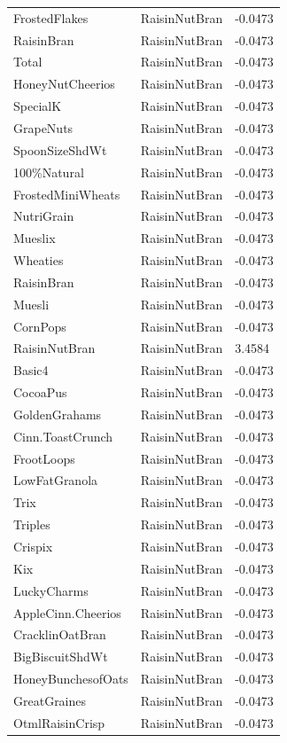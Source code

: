 \begin{table}[!htbp]
\begin{tabular}{lll}
FrostedFlakes & RaisinNutBran & -0.0473
\\
RaisinBran & RaisinNutBran & -0.0473
\\
Total & RaisinNutBran & -0.0473
\\
HoneyNutCheerios & RaisinNutBran & -0.0473
\\
SpecialK & RaisinNutBran & -0.0473
\\
GrapeNuts & RaisinNutBran & -0.0473
\\
SpoonSizeShdWt & RaisinNutBran & -0.0473
\\
100\%Natural & RaisinNutBran & -0.0473
\\
FrostedMiniWheats & RaisinNutBran & -0.0473
\\
NutriGrain & RaisinNutBran & -0.0473
\\
Mueslix & RaisinNutBran & -0.0473
\\
Wheaties & RaisinNutBran & -0.0473
\\
RaisinBran & RaisinNutBran & -0.0473
\\
Muesli & RaisinNutBran & -0.0473
\\
CornPops & RaisinNutBran & -0.0473
\\
RaisinNutBran & RaisinNutBran & 3.4584
\\
Basic4 & RaisinNutBran & -0.0473
\\
CocoaPus & RaisinNutBran & -0.0473
\\
GoldenGrahams & RaisinNutBran & -0.0473
\\
Cinn.ToastCrunch & RaisinNutBran & -0.0473
\\
FrootLoops & RaisinNutBran & -0.0473
\\
LowFatGranola & RaisinNutBran & -0.0473
\\
Trix & RaisinNutBran & -0.0473
\\
Triples & RaisinNutBran & -0.0473
\\
Crispix & RaisinNutBran & -0.0473
\\
Kix & RaisinNutBran & -0.0473
\\
LuckyCharms & RaisinNutBran & -0.0473
\\
AppleCinn.Cheerios & RaisinNutBran & -0.0473
\\
CracklinOatBran & RaisinNutBran & -0.0473
\\
BigBiscuitShdWt & RaisinNutBran & -0.0473
\\
HoneyBunchesofOats & RaisinNutBran & -0.0473
\\
GreatGraines & RaisinNutBran & -0.0473
\\
OtmlRaisinCrisp & RaisinNutBran & -0.0473

\end{tabular}
\end{table}

